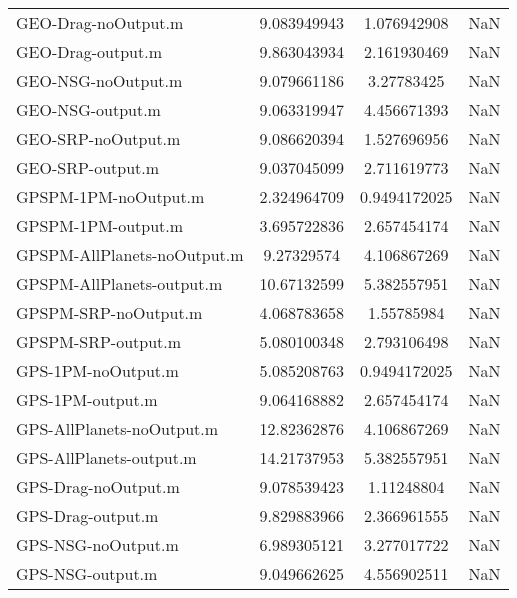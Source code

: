 \begin{table}[htbp!]
\begin{tabular}{lccc}
         GEO-Drag-noOutput.m & 9.083949943 & 1.076942908 & NaN \\
         GEO-Drag-output.m & 9.863043934 & 2.161930469 & NaN \\
         GEO-NSG-noOutput.m & 9.079661186 & 3.27783425 & NaN \\
         GEO-NSG-output.m & 9.063319947 & 4.456671393 & NaN \\
         GEO-SRP-noOutput.m & 9.086620394 & 1.527696956 & NaN \\
         GEO-SRP-output.m & 9.037045099 & 2.711619773 & NaN \\
         GPSPM-1PM-noOutput.m & 2.324964709 & 0.9494172025 & NaN \\
         GPSPM-1PM-output.m & 3.695722836 & 2.657454174 & NaN \\
         GPSPM-AllPlanets-noOutput.m & 9.27329574 & 4.106867269 & NaN \\
         GPSPM-AllPlanets-output.m & 10.67132599 & 5.382557951 & NaN \\
         GPSPM-SRP-noOutput.m & 4.068783658 & 1.55785984 & NaN \\
         GPSPM-SRP-output.m & 5.080100348 & 2.793106498 & NaN \\
         GPS-1PM-noOutput.m & 5.085208763 & 0.9494172025 & NaN \\
         GPS-1PM-output.m & 9.064168882 & 2.657454174 & NaN \\
         GPS-AllPlanets-noOutput.m & 12.82362876 & 4.106867269 & NaN \\
         GPS-AllPlanets-output.m & 14.21737953 & 5.382557951 & NaN \\
         GPS-Drag-noOutput.m & 9.078539423 & 1.11248804 & NaN \\
         GPS-Drag-output.m & 9.829883966 & 2.366961555 & NaN \\
         GPS-NSG-noOutput.m & 6.989305121 & 3.277017722 & NaN \\
         GPS-NSG-output.m & 9.049662625 & 4.556902511 & NaN \\

\end{tabular}
\end{table}
